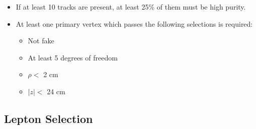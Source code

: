 \begin{itemize}
\item If at least 10 tracks are present, at least 25\% of them must be high purity.

\item At least one primary vertex which passes the following selections is required:
  \begin{itemize} 
  \item Not fake
  \item At least 5 degrees of freedom
  \item $\rho <$ 2 cm
  \item $|z| <$ 24 cm
 
  \end{itemize}




\end{itemize}


\subsection{Lepton Selection}

